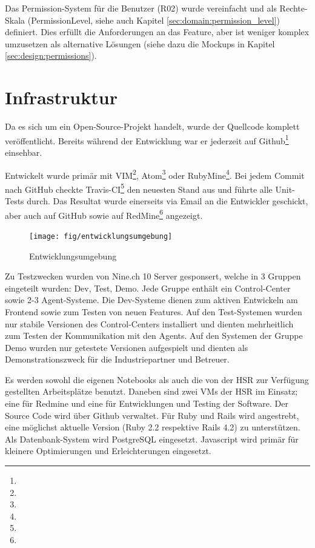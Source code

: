Das Permission-System für die Benutzer (R02) wurde vereinfacht und als Rechte-Skala (PermissionLevel, siehe auch Kapitel \ref{sec:domain:permission_level}) definiert. Dies erfüllt die Anforderungen an das Feature, aber ist weniger komplex umzusetzen als alternative Lösungen (siehe dazu die Mockups in Kapitel \ref{sec:design:permissions}).




\section{Infrastruktur}
\label{sec:pm:infrastructure}

Da es sich um ein Open-Source-Projekt handelt, wurde der Quellcode komplett veröffentlicht. Bereits während der Entwicklung war er jederzeit auf Github\footnote{} einsehbar.

Entwickelt wurde primär mit VIM\footnote{}, Atom\footnote{} oder RubyMine\footnote{}. Bei jedem Commit nach GitHub checkte Travis-CI\footnote{} den neuesten Stand aus und führte alle Unit-Tests durch. Das Resultat wurde einerseits via Email an die Entwickler geschickt, aber auch auf GitHub sowie auf RedMine\footnote{} angezeigt.

\begin{figure}[H]
	\centering
	\texttt{[image: fig/entwicklungsumgebung]}
	\caption{Entwicklungsumgebung}
	\label{fig:pm:entwicklungsumgebung}
\end{figure}

Zu Testzwecken wurden von Nine.ch 10 Server gesponsert, welche  in 3 Gruppen eingeteilt wurden: Dev, Test, Demo. Jede Gruppe enthält ein Control-Center sowie 2-3 Agent-Systeme. Die Dev-Systeme dienen zum aktiven Entwickeln am Frontend sowie zum Testen von neuen Features. Auf den Test-Systemen wurden nur stabile Versionen des Control-Centers installiert und dienten mehrheitlich zum Testen der Kommunikation mit den Agents. Auf den Systemen der Gruppe Demo wurden nur getestete Versionen aufgespielt und dienten als Demonstrationszweck für die Industriepartner und Betreuer.

Es werden sowohl die eigenen Notebooks als auch die von der HSR zur Verfügung gestellten Arbeitsplätze benutzt. Daneben sind zwei VMs der HSR im Einsatz; eine für Redmine und eine für Entwicklungen und Testing der Software. Der Source Code wird über Github verwaltet.
Für Ruby und Rails wird angestrebt, eine möglichst aktuelle Version (Ruby 2.2 respektive Rails 4.2) zu unterstützen. Als Datenbank-System wird PostgreSQL eingesetzt. Javascript wird primär für kleinere Optimierungen und Erleichterungen eingesetzt. 

